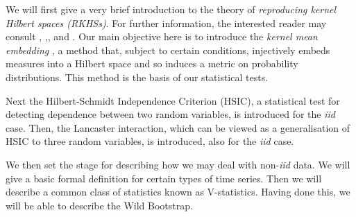 \documentclass[12pt]{article}
\numberwithin{claim}{section}
\numberwithin{lemma}{section}
\numberwithin{theorem}{section}
\begin{document}
We will first give a very brief introduction to the theory of \emph{reproducing kernel Hilbert spaces (RKHSs)}. For further information, the interested reader may consult \cite{hofmann2008kernel}, \cite{scholkopf2002learning},\cite{berlinet2011reproducing}, \cite{steinwart2008support} and \cite{williams2006gaussian}. Our main objective here is to introduce the \emph{kernel mean embedding} \cite{smola2007hilbert}, a method that, subject to certain conditions, injectively embeds measures into a Hilbert space and so induces a metric on probability distributions. This method is the basis of our statistical tests.

Next the Hilbert-Schmidt Independence Criterion (HSIC), a statistical test for detecting dependence between two random variables, is introduced for the \emph{iid} case. Then, the Lancaster interaction, which can be viewed as a generalisation of HSIC to three random variables, is introduced, also for the \emph{iid} case. 

We then set the stage for describing how we may deal with non-\emph{iid} data. We will give a basic formal definition for certain types of time series. Then we will describe a common class of statistics known as V-statistics. Having done this, we will be able to describe the Wild Bootstrap.

\end{document}
